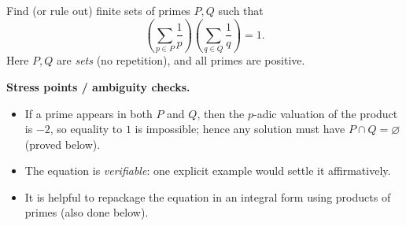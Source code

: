 Find (or rule out) finite sets of primes $P,Q$ such that
\[
\left(\sum_{p\in P}\frac{1}{p}\right)\left(\sum_{q\in Q}\frac{1}{q}\right)=1.
\]
Here $P,Q$ are \emph{sets} (no repetition), and all primes are positive.

\textbf{Stress points / ambiguity checks.}
\begin{itemize}
\item If a prime appears in both $P$ and $Q$, then the $p$-adic valuation of the product is $-2$, so equality to $1$ is impossible; hence any solution must have $P\cap Q=\varnothing$ (proved below).
\item The equation is \emph{verifiable}: one explicit example would settle it affirmatively.
\item It is helpful to repackage the equation in an integral form using products of primes (also done below).
\end{itemize}
